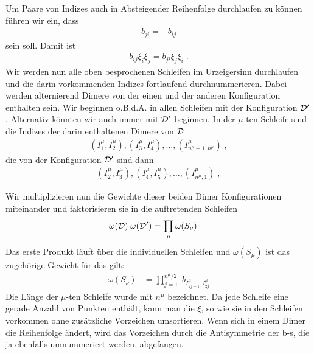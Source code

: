 Um Paare von Indizes auch in Absteigender Reihenfolge durchlaufen zu können führen wir ein, dass
\begin{align*}
    b_{ji} = - b_{ij}
\end{align*}
sein soll. Damit ist 
\begin{align*}
    b_{ij}\xi_i\xi_j = b_{ji}\xi_j\xi_i\;.
\end{align*}
Wir werden nun alle oben besprochenen Schleifen im Urzeigersinn durchlaufen und die darin vorkommenden Indizes fortlaufend durchnummerieren.
Dabei werden alternierend Dimere von der einen und der anderen Konfiguration enthalten sein. Wir beginnen o.B.d.A. in allen Schleifen mit der Konfiguration ${\cal D}'$.
Alternativ könnten wir auch immer mit ${\cal D}'$ beginnen. In der $\mu$-ten Schleife sind die Indizes 
der darin enthaltenen Dimere von ${\cal D}$ 
\begin{align*}
    (I^\mu_1,I^\mu_2), (I^\mu_3,I^\mu_4),\ldots,(I^\mu_{n^\mu-1,n^\mu})\;,
\end{align*}
die von der Konfiguration ${\cal D}'$ sind dann
\begin{align*}
    (I^\mu_2,I^\mu_3), (I^\mu_4,I^\mu_5),\ldots,(I^\mu_{n^\mu,1})\;,
\end{align*}

Wir multiplizieren nun die Gewichte dieser beiden Dimer Konfigurationen miteinander und faktorisieren sie in die auftretenden Schleifen
\begin{align*}
    \omega({\cal D})\;\omega({\cal D}') &= \prod_{\mu} \omega(S_\nu) \;
\end{align*}
Das erste Produkt läuft über die individuellen Schleifen und $\omega(S_\mu)$ ist das zugehörige Gewicht für das gilt:
\begin{align*}
    \omega(S_\nu)  &=  \prod_{j=1}^{n^\mu/2}\; b_{I^\mu_{2j-1},I^\mu_{2j}} 
\end{align*}
Die Länge der $\mu$-ten Schleife wurde mit $n^\mu$ bezeichnet.
Da jede Schleife eine gerade Anzahl von Punkten enthält, kann man die $\xi$, so wie sie in den Schleifen vorkommen ohne zusätzliche Vorzeichen umsortieren.
Wenn sich in einem Dimer die Reihenfolge ändert, wird das Vorzeichen durch die Antisymmetrie der b-s, die ja ebenfalls umnummeriert werden, abgefangen.

